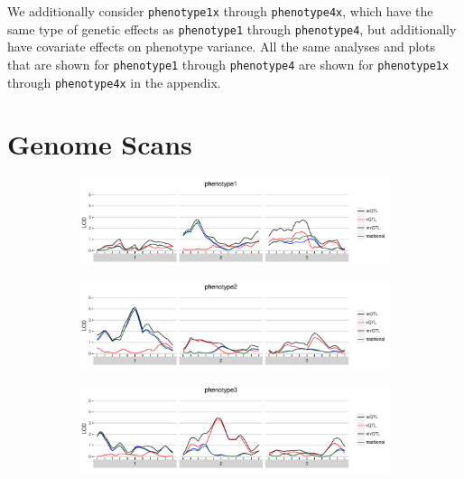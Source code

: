 \documentclass{article}
\begin{document}
We additionally consider \texttt{phenotype1x} through \texttt{phenotype4x}, which have the same type of genetic effects as \texttt{phenotype1} through \texttt{phenotype4}, but additionally have covariate effects on phenotype variance.
All the same analyses and plots that are shown for \texttt{phenotype1} through \texttt{phenotype4} are shown for \texttt{phenotype1x} through \texttt{phenotype4x} in the appendix.




\section*{Genome Scans}

\begin{figure}[t]
    \begin{subfigure}[b]{0.9\textwidth}
        \includegraphics[width=\textwidth]{images/LOD_scan_phenotype1.pdf}
    \end{subfigure}
    \begin{subfigure}[b]{0.9\textwidth}
        \includegraphics[width=\textwidth]{images/LOD_scan_phenotype2.pdf}
    \end{subfigure}
    \begin{subfigure}[b]{0.9\textwidth}
        \includegraphics[width=\textwidth]{images/LOD_scan_phenotype3.pdf}
    \end{subfigure}

\end{figure}
\end{document}
